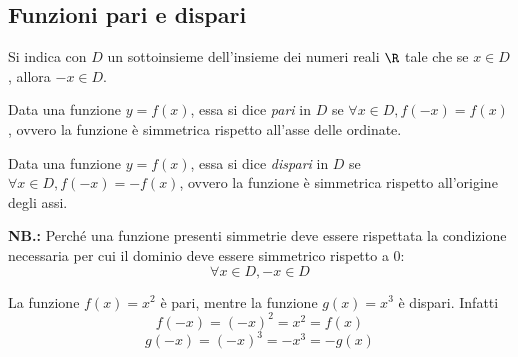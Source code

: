 \documentclass{article}     %
\begin{document}
    \subsection{Funzioni pari e dispari}
        Si indica con $D$ un sottoinsieme dell'insieme dei numeri reali $\R$ tale che se $x\in D$, allora $-x \in D$.
        \begin{boxdef}
            Data una funzione $y=f(x)$, essa si dice \textit{pari} in $D$ se $\forall x \in D, f(-x)=f(x)$, ovvero la funzione è simmetrica rispetto all'asse delle ordinate.
        \end{boxdef}
        \begin{boxdef}
            Data una funzione $y=f(x)$, essa si dice \textit{dispari} in $D$ se $\forall x \in D, f(-x)=-f(x)$, ovvero la funzione è simmetrica rispetto all'origine degli assi.
        \end{boxdef}
        \textbf{NB.:} Perché una funzione presenti simmetrie deve essere rispettata la condizione necessaria per cui il dominio deve essere simmetrico rispetto a $0$: \[\forall x \in D, -x\in D\]
        \begin{ex}
            La funzione $f(x)=x^2$ è pari, mentre la funzione $g(x)=x^3$ è dispari. Infatti \[f(-x)=(-x)^2=x^2=f(x)\] \[g(-x)=(-x)^3=-x^3=-g(x)\]
        \end{ex}
\end{document}
